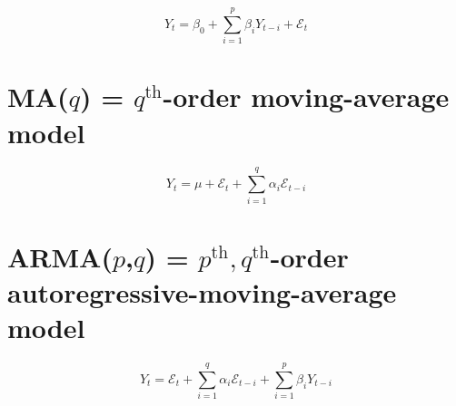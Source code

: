 \documentclass[
]{book}
\theoremstyle{definition}
\theoremstyle{definition}
\theoremstyle{definition}
\theoremstyle{definition}
\theoremstyle{remark}
\begin{document}
\[
Y_{t}=\beta_{0}+\sum_{i=1}^{p}\beta_{i}Y_{t-i}+\mathcal{E}_{t}
\]

\section{\texorpdfstring{MA(\(q\)) = \(q^\text{th}\)-order moving-average model}{MA(q) = q\^{}\textbackslash text\{th\}-order moving-average model}}\label{maq-qtextth-order-moving-average-model}

\[
Y_{t}=\mu+\mathcal{E}_{t}+\sum_{i=1}^{q}\alpha_{i}\mathcal{E}_{t-i}
\]

\section{\texorpdfstring{ARMA(\(p\),\(q\)) = \(p^\text{th},q^\text{th}\)-order autoregressive-moving-average model}{ARMA(p,q) = p\^{}\textbackslash text\{th\},q\^{}\textbackslash text\{th\}-order autoregressive-moving-average model}}\label{armapq-ptextthqtextth-order-autoregressive-moving-average-model}

\[
Y_{t}=\mathcal{E}_{t}+\sum_{i=1}^{q}\alpha_{i}\mathcal{E}_{t-i}+\sum_{i=1}^{p}\beta_{i}Y_{t-i}
\]
\end{document}

